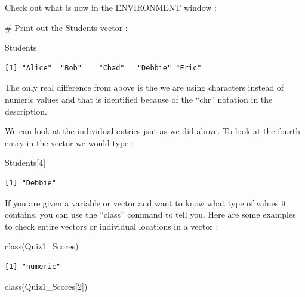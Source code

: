 \documentclass[
  letterpaper,
  DIV=11,
  numbers=noendperiod]{scrreprt}
\newenvironment{Shaded}{\begin{snugshade}}{\end{snugshade}}
\newcommand{\CommentTok}[1]{\textcolor[rgb]{0.37,0.37,0.37}{#1}}
\newcommand{\DecValTok}[1]{\textcolor[rgb]{0.68,0.00,0.00}{#1}}
\newcommand{\FunctionTok}[1]{\textcolor[rgb]{0.28,0.35,0.67}{#1}}
\newcommand{\NormalTok}[1]{\textcolor[rgb]{0.00,0.23,0.31}{#1}}
\begin{document}
Check out what is now in the ENVIRONMENT window :

\begin{Shaded}
\begin{Highlighting}[]
\CommentTok{\# Print out the Students vector :}

\NormalTok{Students}
\end{Highlighting}
\end{Shaded}

\begin{verbatim}
[1] "Alice"  "Bob"    "Chad"   "Debbie" "Eric"  
\end{verbatim}

The only real difference from above is the we are using characters
instead of numeric values and that is identified because of the ``chr''
notation in the description.

We can look at the individual entries jsut as we did above. To look at
the fourth entry in the vector we would type :

\begin{Shaded}
\begin{Highlighting}[]
\NormalTok{Students[}\DecValTok{4}\NormalTok{]}
\end{Highlighting}
\end{Shaded}

\begin{verbatim}
[1] "Debbie"
\end{verbatim}

If you are given a variable or vector and want to know what type of
values it contains, you can use the ``class'' command to tell you. Here
are some examples to check entire vectors or individual locations in a
vector :

\begin{Shaded}
\begin{Highlighting}[]
\FunctionTok{class}\NormalTok{(Quiz1\_Scores)}
\end{Highlighting}
\end{Shaded}

\begin{verbatim}
[1] "numeric"
\end{verbatim}

\begin{Shaded}
\begin{Highlighting}[]
\FunctionTok{class}\NormalTok{(Quiz1\_Scores[}\DecValTok{2}\NormalTok{])}
\end{Highlighting}
\end{Shaded}
\end{document}
